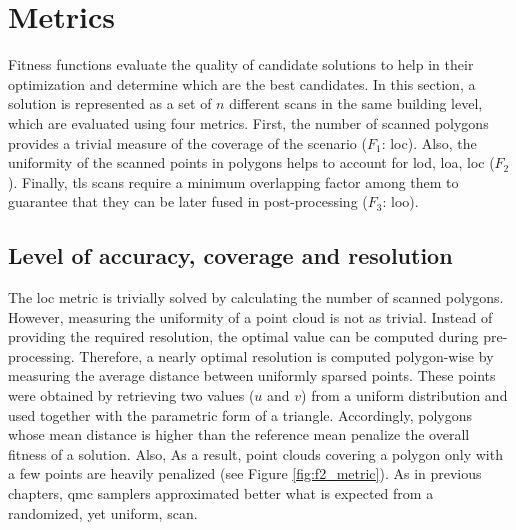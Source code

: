 \section{Metrics}

Fitness functions evaluate the quality of candidate solutions to help in their optimization and determine which are the best candidates. In this section, a solution is represented as a set of $n$ different scans in the same building level, which are evaluated using four metrics. First, the number of scanned polygons provides a trivial measure of the coverage of the scenario ($F_1$: \acrshort{loc}). Also, the uniformity of the scanned points in polygons helps to account for  \acrshort{lod}, \acrshort{loa}, \acrshort{loc} ($F_2$). Finally, \acrshort{tls} scans require a minimum overlapping factor among them to guarantee that they can be later fused in post-processing ($F_3$: \acrshort{loo}). 

\subsection{Level of accuracy, coverage and resolution}

The \acrshort{loc} metric is trivially solved by calculating the number of scanned polygons. However, measuring the uniformity of a point cloud is not as trivial. Instead of providing the required resolution, the optimal value can be computed during pre-processing. Therefore, a nearly optimal resolution is computed polygon-wise by measuring the average distance between uniformly sparsed points. These points were obtained by retrieving two values ($u$ and $v$) from a uniform distribution and used together with the parametric form of a triangle. Accordingly, polygons whose mean distance is higher than the reference mean penalize the overall fitness of a solution. Also, As a result, point clouds covering a polygon only with a few points are heavily penalized (see Figure \ref{fig:f2_metric}). As in previous chapters, \acrshort{qmc} samplers approximated better what is expected from a randomized, yet uniform, scan. 

